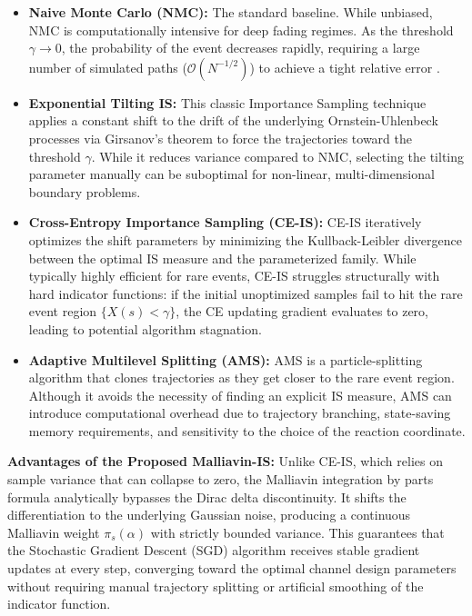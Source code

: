 \documentclass[11pt]{article}
\begin{document}
\begin{itemize}
    \item \textbf{Naive Monte Carlo (NMC):} The standard baseline. While unbiased, NMC is computationally intensive for deep fading regimes. As the threshold $\gamma \to 0$, the probability of the event decreases rapidly, requiring a large number of simulated paths ($\mathcal{O}(N^{-1/2})$) to achieve a tight relative error \citet{benamar2025stochastic}.
    
    \item \textbf{Exponential Tilting IS:} This classic Importance Sampling technique applies a constant shift to the drift of the underlying Ornstein-Uhlenbeck processes via Girsanov's theorem to force the trajectories toward the threshold $\gamma$. While it reduces variance compared to NMC, selecting the tilting parameter manually can be suboptimal for non-linear, multi-dimensional boundary problems.
    
    \item \textbf{Cross-Entropy Importance Sampling (CE-IS):} CE-IS iteratively optimizes the shift parameters by minimizing the Kullback-Leibler divergence between the optimal IS measure and the parameterized family. While typically highly efficient for rare events, CE-IS struggles structurally with hard indicator functions: if the initial unoptimized samples fail to hit the rare event region $\{X(s) < \gamma\}$, the CE updating gradient evaluates to zero, leading to potential algorithm stagnation.
    
    \item \textbf{Adaptive Multilevel Splitting (AMS):} AMS is a particle-splitting algorithm that clones trajectories as they get closer to the rare event region. Although it avoids the necessity of finding an explicit IS measure, AMS can introduce computational overhead due to trajectory branching, state-saving memory requirements, and sensitivity to the choice of the reaction coordinate.
\end{itemize}

\textbf{Advantages of the Proposed Malliavin-IS:} 
Unlike CE-IS, which relies on sample variance that can collapse to zero, the Malliavin integration by parts formula analytically bypasses the Dirac delta discontinuity. It shifts the differentiation to the underlying Gaussian noise, producing a continuous Malliavin weight $\pi_s(\alpha)$ with strictly bounded variance. This guarantees that the Stochastic Gradient Descent (SGD) algorithm receives stable gradient updates at every step, converging toward the optimal channel design parameters without requiring manual trajectory splitting or artificial smoothing of the indicator function.
\end{document}
